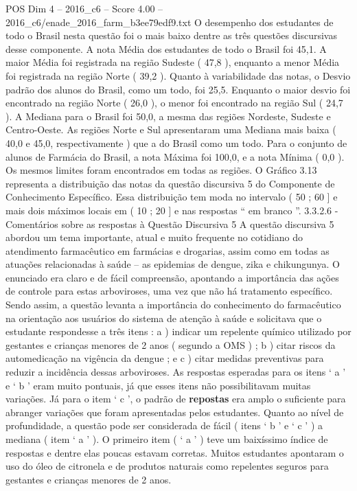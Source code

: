 \begin{textsample}{POS Dim 4 – 2016\_c6 – Score 4.00 – 2016\_c6/enade\_2016\_farm\_b3ee79edf9.txt}
O desempenho dos estudantes de todo o Brasil nesta questão foi o mais baixo dentre as três questões discursivas desse componente.
A nota Média dos estudantes de todo o Brasil foi 45,1.
A maior Média foi registrada na região Sudeste ( 47,8 ), enquanto a menor Média foi registrada na região Norte ( 39,2 ).
Quanto à variabilidade das notas, o Desvio padrão dos alunos do Brasil, como um todo, foi 25,5.
Enquanto o maior desvio foi encontrado na região Norte ( 26,0 ), o menor foi encontrado na região Sul ( 24,7 ).
A Mediana para o Brasil foi 50,0, a mesma das regiões Nordeste, Sudeste e Centro-Oeste.
As regiões Norte e Sul apresentaram uma Mediana mais baixa ( 40,0 e 45,0, respectivamente ) que a do Brasil como um todo.
Para o conjunto de alunos de Farmácia do Brasil, a nota Máxima foi 100,0, e a nota Mínima ( 0,0 ).
Os mesmos limites foram encontrados em todas as regiões.
O Gráfico 3.13 representa a distribuição das notas da questão discursiva 5 do Componente de Conhecimento Específico.
Essa distribuição tem moda no intervalo ( 50 ; 60 ] e mais dois máximos locais em ( 10 ; 20 ] e nas respostas “ em branco ”. 3.3.2.6 - Comentários sobre as respostas à Questão Discursiva 5 A questão discursiva 5 abordou um tema importante, atual e muito frequente no cotidiano do atendimento farmacêutico em farmácias e drogarias, assim como em todas as atuações relacionadas à saúde – as epidemias de dengue, zika e chikungunya.
O enunciado era claro e de fácil compreensão, apontando a importância das ações de controle para estas arboviroses, uma vez que não há tratamento específico.
Sendo assim, a questão levanta a importância do conhecimento do farmacêutico na orientação aos usuários do sistema de atenção à saúde e solicitava que o estudante respondesse a três itens : a ) indicar um repelente químico utilizado por gestantes e crianças menores de 2 anos ( segundo a OMS ) ; b ) citar riscos da automedicação na vigência da dengue ; e c ) citar medidas preventivas para reduzir a incidência dessas arboviroses.
As respostas esperadas para os itens ‘ a ’ e ‘ b ’ eram muito pontuais, já que esses itens não possibilitavam muitas variações.
Já para o item ‘ c ’, o padrão de \textbf{repostas} era amplo o suficiente para abranger variações que foram apresentadas pelos estudantes.
Quanto ao nível de profundidade, a questão pode ser considerada de fácil ( itens ‘ b ’ e ‘ c ’ ) a mediana ( item ‘ a ’ ).
O primeiro item ( ‘ a ’ ) teve um baixíssimo índice de respostas e dentre elas poucas estavam corretas.
Muitos estudantes apontaram o uso do óleo de citronela e de produtos naturais como repelentes seguros para gestantes e crianças menores de 2 anos.

\end{textsample}
